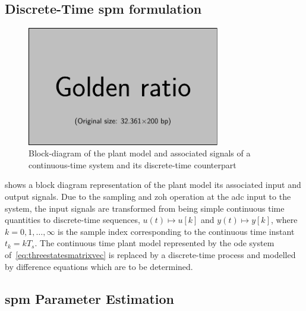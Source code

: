 \subsection{Discrete-Time \gls{spm} formulation}

\begin{figure}[htb]
    \centering
    \includegraphics[width=0.75\textwidth]{placeholder_images/example-image-golden.pdf}
    \caption[Block-diagram of continuous and discrete-time systems]{Block-diagram of the plant model and associated signals of a continuous-time system and its discrete-time counterpart}
    \label{fig:blockdiagctsdisc}
\end{figure}

 shows  a block  diagram representation of  the plant
model its associated input and output signals. Due to the sampling and \gls{zoh}
operation  at  the  \gls{adc}  input  to  the  system,  the  input  signals  are
transformed  from  being  simple  continuous time  quantities  to  discrete-time
sequences,  \ie{} $u(t)  \mapsto  u[k]$  and $y(t)  \mapsto  y[k]$,  where $k  =
0,1,\dots,∞$ is the sample index  corresponding to the continuous time instant
$t_k  = kT_s$.  The continuous  time plant  model represented  by the  \gls{ode}
system of~\cref{eq:threestatesmatrixvec} is replaced  by a discrete-time process
and modelled by difference equations which are to be determined.

\subsection{\gls{spm} Parameter Estimation}\label{sec:spmparameterestim}





